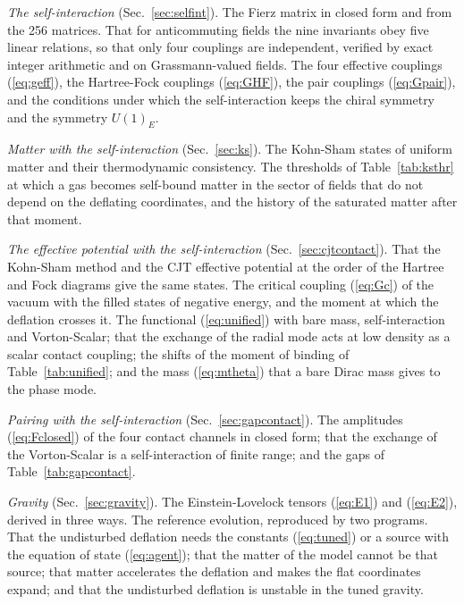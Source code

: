 \emph{The self-interaction} (Sec.~\ref{sec:selfint}). The Fierz matrix in closed form and from the
256 matrices. That for anticommuting fields the nine invariants obey five linear relations, so that
only four couplings are independent, verified by exact integer arithmetic and on Grassmann-valued
fields. The four effective couplings (\ref{eq:geff}), the Hartree-Fock couplings (\ref{eq:GHF}), the
pair couplings (\ref{eq:Gpair}), and the conditions under which the self-interaction keeps the chiral
symmetry and the symmetry $U(1)_E$.

\emph{Matter with the self-interaction} (Sec.~\ref{sec:ks}). The Kohn-Sham states of uniform matter
and their thermodynamic consistency.
The thresholds of Table~\ref{tab:ksthr} at which a gas becomes self-bound matter in the sector of
fields that do not depend on the deflating coordinates, and the history of the saturated matter
after that moment.

\emph{The effective potential with the self-interaction} (Sec.~\ref{sec:cjtcontact}). That the
Kohn-Sham method and the CJT effective potential at the order of the Hartree and Fock diagrams give
the same states. The critical coupling (\ref{eq:Gc}) of the vacuum with the filled states of
negative energy, and the moment at which the deflation crosses it. The functional
(\ref{eq:unified}) with bare mass, self-interaction and Vorton-Scalar; that the exchange of the
radial mode acts at low density as a scalar contact coupling; the shifts of the moment of binding of
Table~\ref{tab:unified}; and the mass (\ref{eq:mtheta}) that a bare Dirac mass gives to the phase
mode.

\emph{Pairing with the self-interaction} (Sec.~\ref{sec:gapcontact}). The amplitudes
(\ref{eq:Fclosed}) of the four contact channels in closed form; that the exchange of the
Vorton-Scalar is a self-interaction of finite range; and the gaps of Table~\ref{tab:gapcontact}.

\emph{Gravity} (Sec.~\ref{sec:gravity}). The Einstein-Lovelock tensors (\ref{eq:E1}) and
(\ref{eq:E2}), derived in three ways. The reference evolution, reproduced by two programs. That the
undisturbed deflation needs the constants (\ref{eq:tuned}) or a source with the equation of state
(\ref{eq:agent}); that the matter of the model cannot be that source; that matter accelerates the
deflation and makes the flat coordinates expand; and that the undisturbed deflation is unstable in
the tuned gravity.

